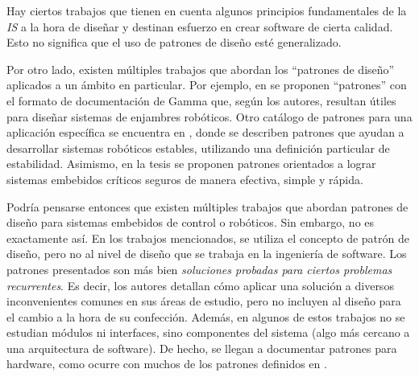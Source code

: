 Hay ciertos trabajos \cite{good-desing-agrobot,good-desing-street} que tienen en cuenta algunos principios fundamentales de la \textit{IS} a la hora de diseñar y destinan esfuerzo en crear software de cierta calidad. Esto no significa que el uso de patrones de diseño esté generalizado.

Por otro lado, existen múltiples trabajos que abordan los ``patrones de diseño'' aplicados a un ámbito en particular. Por ejemplo, en \cite{enjambre} se proponen ``patrones'' con el formato de documentación de Gamma \cite{Gamma:1995:DPE:186897} que, según los autores, resultan útiles para diseñar sistemas de enjambres robóticos. Otro catálogo de patrones para una aplicación específica se encuentra en \cite{stable}, donde se describen patrones que ayudan a desarrollar sistemas robóticos estables, utilizando una definición particular de estabilidad. Asimismo, en la tesis \cite{critical} se proponen patrones orientados a lograr sistemas embebidos críticos seguros de manera efectiva, simple y rápida.

Podría pensarse entonces que existen múltiples trabajos que abordan patrones de diseño para sistemas embebidos de control o robóticos. Sin embargo, no es exactamente así. En los trabajos mencionados, se utiliza el concepto de patrón de diseño, pero no al nivel de diseño que se trabaja en la ingeniería de software. Los patrones presentados son más bien \textit{soluciones probadas para ciertos problemas recurrentes}. Es decir, los autores detallan cómo aplicar una solución a diversos inconvenientes comunes en sus áreas de estudio, pero no incluyen al diseño para el cambio a la hora de su confección. Además, en algunos de estos trabajos no se estudian módulos ni interfaces, sino componentes del sistema (algo más cercano a una arquitectura de software). De hecho, se llegan a documentar patrones para hardware, como ocurre con muchos de los patrones definidos en \cite{critical}.

